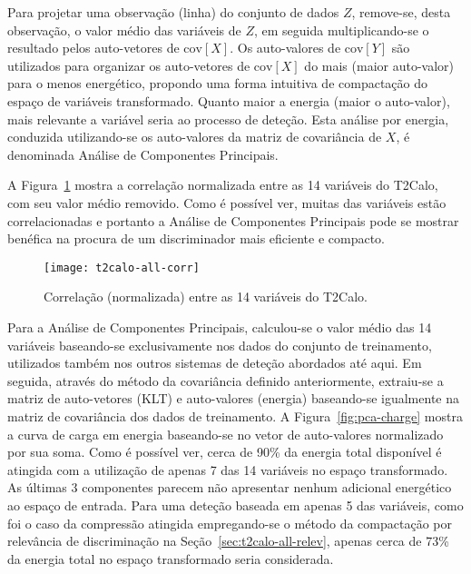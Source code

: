 Para projetar uma observação (linha) do conjunto de dados $Z$, remove-se,
desta observação, o valor médio das variáveis de $Z$, em seguida
multiplicando-se o resultado pelos auto-vetores de $\text{cov}[X]$. Os
auto-valores de $\text{cov}[Y]$ são utilizados para organizar os auto-vetores
de $\text{cov}[X]$ do mais (maior auto-valor) para o menos energético,
propondo uma forma intuitiva de compactação do espaço de variáveis
transformado. Quanto maior a energia (maior o auto-valor), mais relevante a
variável seria ao processo de deteção. Esta análise por energia, conduzida
utilizando-se os auto-valores da matriz de covariância de $X$, é denominada
Análise de Componentes Principais.

A Figura~\ref{fig:t2calo-correl} mostra a correlação normalizada entre as 14
variáveis do T2Calo, com seu valor médio removido. Como é possível ver, muitas
das variáveis estão correlacionadas e portanto a Análise de Componentes
Principais pode se mostrar benéfica na procura de um discriminador mais
eficiente e compacto.

\begin{figure}
\begin{center}
\texttt{[image: t2calo-all-corr]}
\end{center}
\caption{Correlação (normalizada) entre as 14 variáveis do T2Calo.}
\label{fig:t2calo-correl}
\end{figure}

Para a Análise de Componentes Principais, calculou-se o valor médio das 14
variáveis baseando-se exclusivamente nos dados do conjunto de treinamento,
utilizados também nos outros sistemas de deteção abordados até aqui. Em
seguida, através do método da covariância definido anteriormente, extraiu-se a
matriz de auto-vetores (KLT) e auto-valores (energia) baseando-se igualmente
na matriz de covariância dos dados de treinamento. A
Figura~\ref{fig:pca-charge} mostra a curva de carga em energia baseando-se no
vetor de auto-valores normalizado por sua soma. Como é possível ver, cerca de
90\% da energia total disponível é atingida com a utilização de apenas 7 das
14 variáveis no espaço transformado. As últimas 3 componentes parecem não
apresentar nenhum adicional energético ao espaço de entrada. Para uma deteção
baseada em apenas 5 das variáveis, como foi o caso da compressão atingida
empregando-se o método da compactação por relevância de discriminação na
Seção~\ref{sec:t2calo-all-relev}, apenas cerca de 73\% da energia total no
espaço transformado seria considerada.

